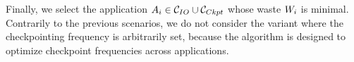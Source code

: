  Finally, we select the application $A_{i} \in \mathcal{C}_{IO} \cup \mathcal{C}_{Ckpt}$ whose waste
 $W_{i}$ is minimal.
Contrarily to the previous scenarios, we do not consider the variant where the checkpointing frequency is arbitrarily set, because the \leastwaste algorithm is designed to optimize checkpoint frequencies across applications.
